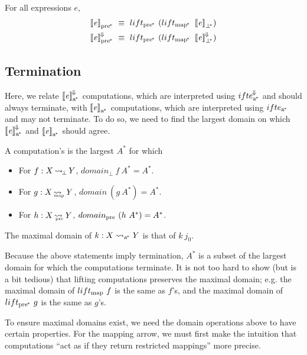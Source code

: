 \begin{corollary}
For all expressions $\mathit{e}$,
\begin{equation}
\begin{aligned}
	\meaningof{\mathit{e}}\ppre &\ \equiv \ \liftppre~(\liftpmap~\meaningof{\mathit{e}}_\pbot)
\\
	\meaningofconv{\mathit{e}}\ppre &\ \equiv \ \liftppre~(\liftpmap~\meaningofconv{\mathit{e}}_\pbot)
\end{aligned}
\end{equation}
\end{corollary}

\subsection{Termination}

Here, we relate $\left\llbracket{\mathit{e}}\right\rrbracket^{\mspace{-2mu}\Downarrow\mspace{-2mu}}_\mathrm{a^{\mspace{-2mu}*}}$ computations, which are interpreted using $ifte^{\mspace{-2mu}\Downarrow\mspace{-2mu}}_\mathrm{a^{\mspace{-2mu}*}}$ and should always terminate, with $\left\llbracket{\mathit{e}}\right\rrbracket_\mathrm{a^{\mspace{-2mu}*}}$ computations, which are interpreted using $ifte_\mathrm{a^{\mspace{-2mu}*}}$ and may not terminate.
To do so, we need to find the largest domain on which $\left\llbracket{\mathit{e}}\right\rrbracket^{\mspace{-2mu}\Downarrow\mspace{-2mu}}_\mathrm{a^{\mspace{-2mu}*}}$ and $\left\llbracket{\mathit{e}}\right\rrbracket_\mathrm{a^{\mspace{-2mu}*}}$ should agree.

\begin{definition}
\label{def:maximal-domain}
A computation's  is the largest $A^*$ for which
\begin{itemize}
	\item For $f : X \operatorname{\rightsquigarrow_{\mspace{-3mu}\bot}} Y$, $domain_\bot~f~A^* = A^*$.
	\item For $g : X \operatorname{\rightsquigarrow_{\mspace{-21mu}_\mathrm{map}}} Y$, $domain~(g~A^*) = A^*$.
	\item For $h : X \operatorname{\rightsquigarrow_{\mspace{-19mu}_\mathrm{pre}}} Y$, $domain_\mathrm{pre}~(h~A^*) = A^*$.
\end{itemize}
The maximal domain of $k : X \rightsquigarrow_\mathrm{a^{\mspace{-2mu}*}} Y$ is that of $k~j_0$.
\end{definition}

Because the above statements imply termination, $A^*$ is a subset of the largest domain for which the computations terminate.
It is not too hard to show (but is a bit tedious) that lifting computations preserves the maximal domain; e.g. the maximal domain of $lift_\mathrm{map}~f$ is the same as $f$'s, and the maximal domain of $lift_\mathrm{pre^{\mspace{-2mu}*}}~g$ is the same as $g$'s.

To ensure maximal domains exist, we need the domain operations above to have certain properties.
For the mapping arrow, we must first make the intuition that computations ``act as if they return restricted mappings'' more precise.

